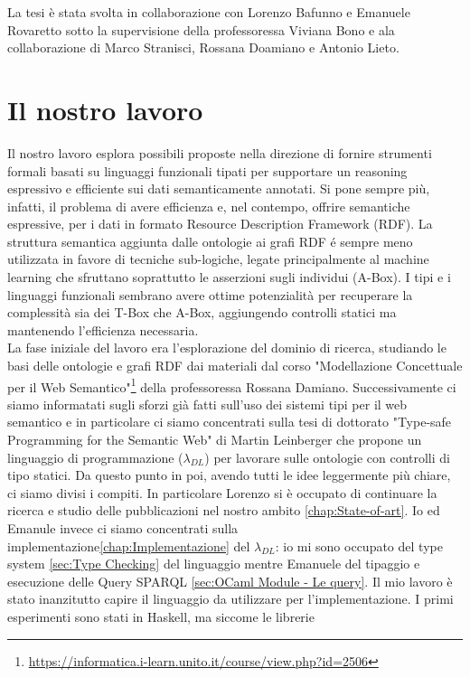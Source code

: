 La tesi è stata svolta in collaborazione con Lorenzo Bafunno e Emanuele Rovaretto sotto la supervisione della professoressa Viviana Bono e ala collaborazione di Marco Stranisci, Rossana Doamiano e Antonio Lieto.


\section{Il nostro lavoro}
    Il nostro lavoro esplora possibili proposte nella direzione di fornire strumenti formali basati su linguaggi funzionali tipati per supportare un reasoning
    espressivo e efficiente sui dati semanticamente annotati. Si pone sempre più, infatti, il problema di avere efficienza e, nel contempo, offrire semantiche 
    espressive, per i dati in formato Resource Description Framework (RDF). La struttura semantica aggiunta dalle ontologie ai grafi RDF \'e sempre meno utilizzata
    in favore di tecniche sub-logiche, legate principalmente al machine learning che sfruttano soprattutto le asserzioni sugli individui (A-Box). 
    I tipi e i linguaggi funzionali sembrano avere ottime potenzialità per recuperare la complessità sia dei T-Box che A-Box, aggiungendo controlli statici
    ma mantenendo l'efficienza necessaria.
    \\La fase iniziale del lavoro era l'esplorazione del dominio di ricerca,
    studiando le basi delle ontologie e grafi RDF dai materiali dal corso "Modellazione Concettuale per il Web Semantico"\footnote{\url{https://informatica.i-learn.unito.it/course/view.php?id=2506}} 
    della professoressa Rossana Damiano.
    Successivamente ci siamo informatati sugli sforzi già fatti sull'uso dei sistemi tipi per il web semantico e in particolare ci siamo concentrati sulla tesi di
    dottorato "Type-safe Programming for the Semantic Web"\cite{leinbergerphdthesis} di Martin Leinberger che propone un linguaggio di programmazione ($\lambda_{DL}$) per lavorare sulle ontologie con 
    controlli di tipo statici. Da questo punto in poi, avendo tutti le idee leggermente più chiare, ci siamo divisi i compiti. In particolare Lorenzo si
    è occupato di continuare la ricerca e studio delle pubblicazioni nel nostro ambito \ref{chap:State-of-art}. Io ed Emanule invece ci siamo concentrati sulla implementazione\ref{chap:Implementazione}
    del $\lambda_{DL}$: io mi sono occupato del type system \ref{sec:Type Checking} del linguaggio mentre Emanuele del tipaggio e esecuzione delle Query SPARQL \ref{sec:OCaml Module - Le query}.
    Il mio lavoro è stato inanzitutto capire il linguaggio da utilizzare per l'implementazione. I primi esperimenti sono stati in Haskell, ma siccome le librerie
